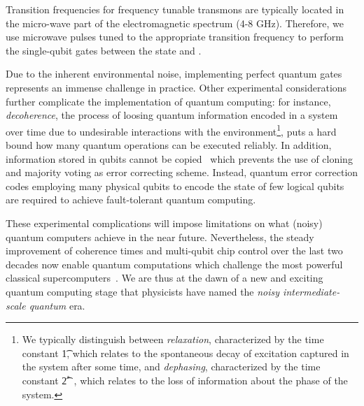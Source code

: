 Transition frequencies for frequency tunable transmons are typically located in the micro-wave part of the electromagnetic spectrum (4-8 GHz). Therefore, we use microwave pulses tuned to the appropriate transition frequency to perform the single-qubit gates between the state \0 and \1.

Due to the inherent environmental noise, implementing perfect quantum gates represents an immense challenge in practice. Other experimental considerations further complicate the implementation of quantum computing: for instance, \textit{decoherence}, the process of loosing quantum information encoded in a system over time due to undesirable interactions with the environment\footnote{We typically distinguish between \textit{relaxation}, characterized by the time constant \t{1}, which relates to the spontaneous decay of excitation captured in the system after some time, and \textit{dephasing}, characterized by the time constant \t{2}$^{*}$ , which relates to the loss of information about the phase of the system.}, puts a hard bound how many quantum operations can be executed reliably. 
In addition, information stored in qubits cannot be copied~\cite{Wootters1982ACloned} which prevents the use of cloning and majority voting as error correcting scheme. Instead, quantum error correction codes employing many physical qubits to encode the state of few logical qubits~\cite{Gottesman2010AnComputation, DiVincenzo1996Fault-TolerantCodes, Fowler2012SurfaceComputation} are required to achieve fault-tolerant quantum computing. 

These experimental complications will impose limitations on what (noisy) quantum computers achieve in the near future. Nevertheless, the steady improvement of coherence times and multi-qubit chip control over the last two decades now enable quantum computations which challenge the most powerful classical supercomputers~\cite{Arute2019QuantumProcessor}.  We are thus at the dawn of a new and exciting quantum computing stage that physicists have named the \textit{noisy intermediate-scale quantum} era.

